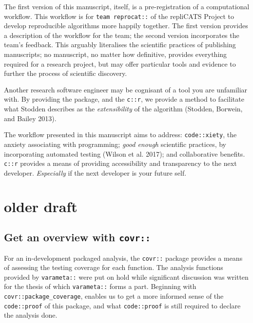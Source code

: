 \documentclass[
]{article}
\begin{document}
The first version of this manuscript, itself, is a pre-registration of a computational workflow. This workflow is for \texttt{team\ reprocat::} of the repliCATS Project to develop reproducible algorithms more happily together. The first version provides a description of the workflow for the team; the second version incorporates the team's feedback. This arguably literalises the scientific practices of publishing manuscripts; no manuscript, no matter how definitive, provides everything required for a research project, but may offer particular tools and evidence to further the process of scientific discovery.

Another research software engineer may be cognisant of a tool you are unfamiliar with. By providing the package, and the \texttt{c::r}, we provide a method to facilitate what Stodden describes as the \emph{extensibility} of the algorithm (Stodden, Borwein, and Bailey 2013).

The workflow presented in this manuscript aims to address: \texttt{code::xiety}, the anxiety associating with programming; \emph{good enough} scientific practices, by incorporating automated testing (Wilson et al. 2017); and collaborative benefits. \texttt{c::r} provides a means of providing accessibility and transparency to the next developer. \emph{Especially} if the next developer is your future self.

\hypertarget{older-draft}{%
\section{older draft}\label{older-draft}}

\hypertarget{get-an-overview-with-covr}{%
\subsection{\texorpdfstring{Get an overview with \texttt{covr::}\label{sec: covr}}{Get an overview with covr::}}\label{get-an-overview-with-covr}}

For an in-development packaged analysis, the \texttt{covr::} package provides a means of assessing the testing coverage for each function. The analysis functions provided by \texttt{varameta::} were put on hold while significant discussion was written for the thesis of which \texttt{varameta::} forms a part. Beginning with \texttt{covr::package\_coverage}, enables us to get a more informed sense of the \texttt{code::proof} of this package, and what \texttt{code::proof} is still required to declare the analysis done.
\end{document}
